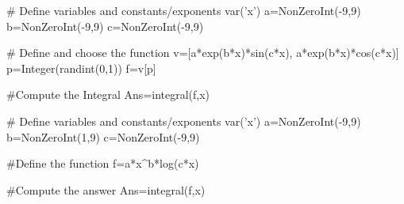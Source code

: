 
\begin{sagesilent}
# Define variables and constants/exponents
var('x')
a=NonZeroInt(-9,9)
b=NonZeroInt(-9,9)
c=NonZeroInt(-9,9)

# Define and choose the function
v=[a*exp(b*x)*sin(c*x), a*exp(b*x)*cos(c*x)]
p=Integer(randint(0,1))
f=v[p]

#Compute the Integral
Ans=integral(f,x)
\end{sagesilent}



\begin{sagesilent}
# Define variables and constants/exponents
var('x')
a=NonZeroInt(-9,9)
b=NonZeroInt(1,9)
c=NonZeroInt(-9,9)

#Define the function
f=a*x^b*log(c*x)

#Compute the answer
Ans=integral(f,x)
\end{sagesilent}




